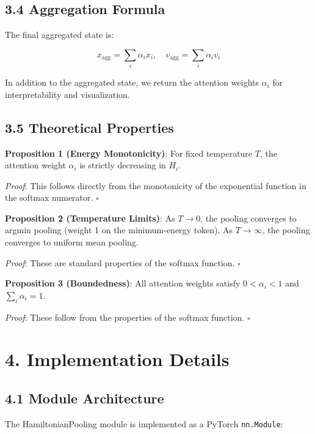 \documentclass[12pt]{article}
\begin{document}
\subsection{3.4 Aggregation Formula}

The final aggregated state is:

\begin{equation}
x_{\text{agg}} = \sum_i \alpha_i x_i, \quad v_{\text{agg}} = \sum_i \alpha_i v_i
\end{equation}

In addition to the aggregated state, we return the attention weights $\alpha_i$ for interpretability and visualization.

\subsection{3.5 Theoretical Properties}

\textbf{Proposition 1 (Energy Monotonicity)}: For fixed temperature $T$, the attention weight $\alpha_i$ is strictly decreasing in $H_i$.

\textit{Proof}: This follows directly from the monotonicity of the exponential function in the softmax numerator. $\square$

\textbf{Proposition 2 (Temperature Limits)}: As $T \to 0$, the pooling converges to argmin pooling (weight 1 on the minimum-energy token). As $T \to \infty$, the pooling converges to uniform mean pooling.

\textit{Proof}: These are standard properties of the softmax function. $\square$

\textbf{Proposition 3 (Boundedness)}: All attention weights satisfy $0 < \alpha_i < 1$ and $\sum_i \alpha_i = 1$.

\textit{Proof}: These follow from the properties of the softmax function. $\square$

\section{4. Implementation Details}

\subsection{4.1 Module Architecture}

The HamiltonianPooling module is implemented as a PyTorch \texttt{nn.Module}:
\end{document}
